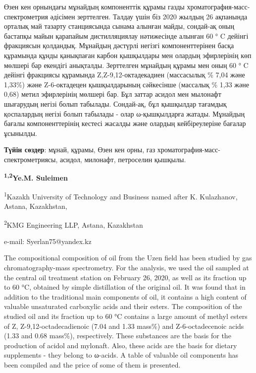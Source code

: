 Өзен кен орнындағы мұнайдың компоненттік құрамы газды
хроматография-масс-спектрометрия әдісімен зерттелген. Талдау үшін біз
2020 жылдың 26 ақпанында орталық май тазарту станциясында сынама алынған
майды, сондай-ақ оның бастапқы майын қарапайым дистилляциялау
нәтижесінде алынған 60 ° C дейінгі фракциясын қолдандық. Мұнайдың
дәстүрлі негізгі компоненттерінен басқа құрамында құнды қанықпаған
карбон қышқылдары мен олардың эфирлерінің көп мөлшері бар екендігі
анықталды. Зерттелген мұнайдың құрамы мен оның 60 ° C дейінгі фракциясы
құрамында Z,Z-9,12-октадекадиен (массасылық \% 7,04 және 1,33\%) және
Z-6-октадецен қышқылдарының сәйкесінше (массалық \% 1,33 және 0,68)
метил эфирлерінің мөлшері бар. Бұл заттар асидол мен мылонафт шығарудың
негізі болып табылады. Сондай-ақ, бұл қышқылдар тағамдық қоспалардың
негізі болып табылады - олар ω-қышқылдарға жатады. Мұнайдың бағалы
компоненттерінің кестесі жасалды және олардың кейбіреулеріне бағалар
ұсынылды.

{\bfseries Түйін сөздер}: мұнай, құрамы, Өзен кен орны, газ
хроматография-масс-спектрометриясы, асидол, милонафт, петроселин
қышқылы.


\begin{center}
{\bfseries \textsuperscript{1,2}Ye.M. Suleimen}

\textsuperscript{1}Kazakh University of Technology and Business named
after K. Kulazhanov, Astana, Kazakhstan,

\textsuperscript{2}KMG Engineering LLP, Astana, Kazakhstan

e-mail: Syerlan75@yandex.kz
\end{center}

The compositional composition of oil from the Uzen field has been
studied by gas chromatography-mass spectrometry. For the analysis, we
used the oil sampled at the central oil treatment station on February
26, 2020, as well as its fraction up to 60 °C, obtained by simple
distillation of the original oil. It was found that in addition to the
traditional main components of oil, it contains a high content of
valuable unsaturated carboxylic acids and their esters. The composition
of the studied oil and its fraction up to 60 °C contains a large amount
of methyl esters of Z, Z-9,12-octadecadienoic (7.04 and 1.33 mass\%) and
Z-6-octadecenoic acids (1.33 and 0.68 mass\%), respectively. These
substances are the basis for the production of acidol and mylonaft.
Also, these acids are the basis for dietary supplements - they belong to
ω-acids. A table of valuable oil components has been compiled and the
price of some of them is presented.

